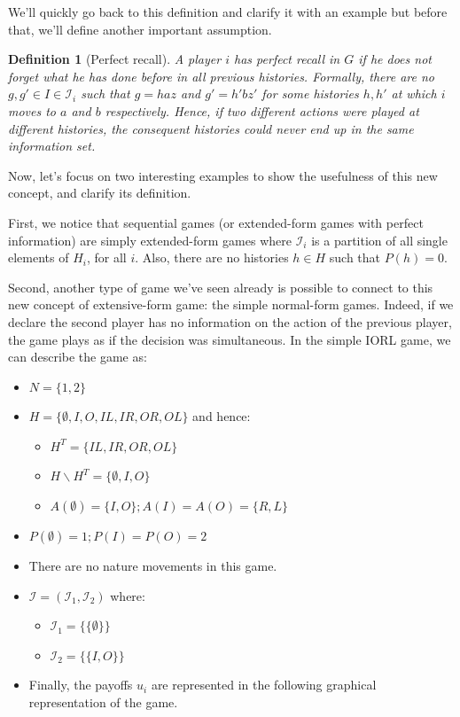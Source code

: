 \documentclass[12pt]{report}
\newtheorem{definition}{Definition}[chapter]
\begin{document}
We'll quickly go back to this definition and clarify it with an example but before that, we'll define another important assumption.

\begin{definition}[Perfect recall]
A player $i$ has perfect recall in $G$ if he does not forget what he has done before in all previous histories. Formally, there are no $g,g'\in I\in \mathcal{I}_i$ such that $g = haz$ and $g' = h'bz'$ for some histories $h, h'$ at which $i$ moves to $a$ and $b$ respectively. Hence, if two different actions were played at different histories, the consequent histories could never end up in the same information set.
\end{definition}

Now, let's focus on two interesting examples to show the usefulness of this new concept, and clarify its definition.

First, we notice that sequential games (or extended-form games with perfect information) are simply extended-form games where $\mathcal{I}_i$ is a partition of all single elements of $H_i$, for all $i$. Also, there are no histories $h\in H$ such that $P(h)=0$.

Second, another type of game we've seen already is possible to connect to this new concept of extensive-form game: the simple normal-form games. Indeed, if we declare the second player has no information on the action of the previous player, the game plays as if the decision was simultaneous. In the simple IORL game, we can describe the game as:\begin{itemize}
\item $N = \{1, 2\}$
\item $H = \{\emptyset, I, O, IL, IR, OR, OL\}$ and hence:\begin{itemize}
\item $H^T = \{IL, IR, OR, OL\}$
\item $H\backslash H^T = \{\emptyset, I, O\}$
\item $A(\emptyset) = \{I, O\} ; A(I) = A(O) = \{R, L\}$
\end{itemize}
\item $P(\emptyset) = 1 ; P(I) = P(O) = 2$
\item There are no nature movements in this game.
\item $\mathcal{I} = ( \mathcal{I}_1, \mathcal{I}_2 )$ where:\begin{itemize}
\item $\mathcal{I}_1 = \{\{\emptyset\}\} $
\item $\mathcal{I}_2 = \{\{I, O\}\} $
\end{itemize}
\item Finally, the payoffs $u_i$ are represented in the following graphical representation of the game.
\end{itemize}
\end{document}
